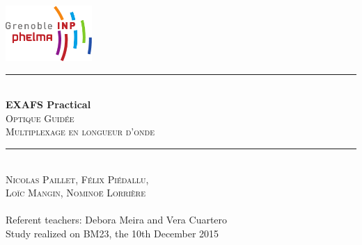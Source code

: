 \begin{titlepage}
    \vspace*{-10px}
    \includegraphics[height=80px]{Images/logo_phelma.pdf}
    \vspace*{-80px}
\begin{flushright}
    \vspace*{60px}
\end{flushright}

\vspace*{0.5cm}
\begin{center}
\rule{\linewidth}{0.5mm}
    \\[0.4cm]
    {\huge \textbf{EXAFS Practical}}
    \\[0.4cm]
    {\huge \textsc{Optique Guidée}}
    \\[0.4cm]
    {\Large\textsc{Multiplexage en longueur d'onde}}
    \\[0.4cm]
\rule{\linewidth}{0.5mm}
\\[1cm]

    \LARGE{\textsc{Nicolas Paillet, Félix Piédallu,\\ Loïc Mangin, Nominoë Lorrière}}
    \\[0.7cm]
    \large{~}%
    \\[1cm]

    \Large{Referent teachers: Debora Meira and Vera Cuartero}\\[1cm]

    \large{Study realized on BM23, the 10th December 2015}\\[2cm]


\end{center}
\end{titlepage}

\tableofcontents        %
\newpage
{}  %

